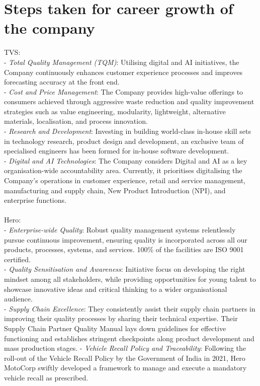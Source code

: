 \section{Steps taken for career growth of the company}
TVS:\\
- \textit{Total Quality Management (TQM)}: Utilising digital and AI initiatives, the Company continuously enhances customer experience processes and improves forecasting accuracy at the front end.\\
- \textit{Cost and Price Management}: The Company provides high-value offerings to consumers achieved through aggressive waste reduction and quality improvement strategies such as value engineering, 	modularity, lightweight, alternative materials, localisation, and process innovation.\\
- \textit{Research and Development}: Investing in building world-class in-house skill sets	in technology research, product design and development, an exclusive team of specialised engineers has been
formed for in-house software development.\\
- \textit{Digital and AI Technologies}: The Company considers Digital and AI as a key organisation-wide accountability area. Currently, it prioritises digitalising the Company’s operations in customer experience, retail and service management, manufacturing and supply chain, New Product Introduction (NPI), and enterprise functions.\\\\
Hero:\\
- \textit{Enterprise-wide Quality}: Robust quality management systems relentlessly pursue continuous improvement, ensuring quality is incorporated across all our products, processes, systems, and services.
100\% of the facilities are ISO 9001 certified.\\
- \textit{Quality Sensitisation and Awareness}: Initiative focus
on developing the right mindset among all stakeholders, while
providing opportunities for young talent to showcase innovative
ideas and critical thinking to a wider organisational audience.\\
- \textit{Supply Chain Excellence}: They consistently assist their supply chain partners in improving their quality processes by sharing their technical expertise. Their Supply Chain Partner Quality Manual lays down guidelines for effective functioning and establishes stringent checkpoints along	product development and mass production stages.
- \textit{Vehicle Recall Policy and Traceability}: Following the roll-out of the Vehicle Recall Policy by the
Government of India in 2021, Hero MotoCorp swiftly
developed a framework to manage and execute a mandatory
vehicle recall as prescribed.